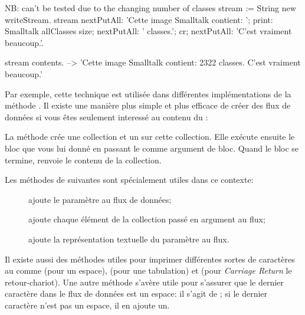 \documentclass[a4paper,10pt,twoside]{book}
\begin{document}
\begin{code}{NB: can't be tested due to the changing number of classes}
stream := String new writeStream.
stream
  nextPutAll: 'Cette image Smalltalk contient: ';
  print: Smalltalk allClasses size;
  nextPutAll: ' classes.';
  cr;
  nextPutAll: 'C'est vraiment beaucoup.'.

stream contents. --> 'Cette image Smalltalk contient: 2322 classes.
C'est vraiment beaucoup.'
\end{code}

Par exemple, cette technique est utilis\'ee dans diff\'erentes 
impl\'ementations de la m\'ethode . Il existe une mani\`ere
plus simple et plus efficace de cr\'eer des flux de donn\'ees si vous \^etes
seulement interess\'e au contenu du \stream:


La m\'ethode   cr\'ee une collection et un \stream sur cette collection.
Elle ex\'ecute ensuite le bloc que vous lui donn\'e en passant le \stream comme argument de bloc. Quand le bloc se termine, 
renvoie le contenu de la collection.

Les m\'ethodes de  suivantes sont sp\'ecialement utiles dans ce contexte:

\begin{description}
\item[] ajoute le param\`etre au flux de donn\'ees;
\item[] ajoute chaque \'el\'ement de la collection pass\'e en argument au flux;
\item[] ajoute la repr\'esentation textuelle du param\`etre au flux.
\end{description}

Il existe aussi des m\'ethodes utiles pour imprimer diff\'erentes sortes
de caract\`eres au \stream comme  (pour un espace), 
    (pour une tabulation) et
 (pour \emph{Carriage Return} \cad le retour-chariot).
Une autre m\'ethode s'av\`ere utile pour s'assurer que le dernier caract\`ere
dans le flux de donn\'ees est un espace: il s'agit de ; si le dernier caract\`ere n'est pas un espace, il en ajoute un.
\end{document}
